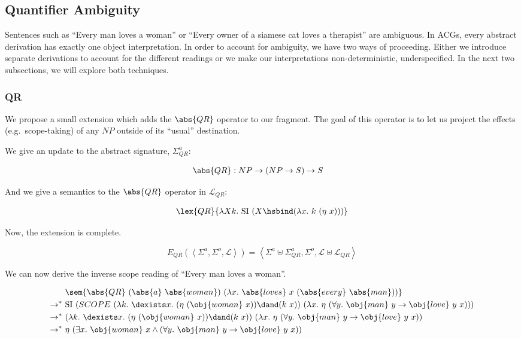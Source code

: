\subsection{Quantifier Ambiguity}

Sentences such as ``Every man loves a woman'' or ``Every owner of a siamese
cat loves a therapist'' are ambiguous. In ACGs, every abstract derivation
has exactly one object interpretation. In order to account for ambiguity,
we have two ways of proceeding. Either we introduce separate derivations to
account for the different readings or we make our interpretations
non-deterministic, underspecified. In the next two subsections, we will
explore both techniques.

\subsubsection{QR}

We propose a small extension which adds the $\abs{QR}$ operator to our
fragment. The goal of this operator is to let us project the effects
(e.g.\ scope-taking) of any $NP$ outside of its ``usual'' destination.

We give an update to the abstract signature, $\Sigma^a_{QR}$:

\begin{align*}
  \abs{QR} &: NP \to (NP \to S) \to S
\end{align*}

And we give a semantics to the $\abs{QR}$ operator in $\mathcal{L}_{QR}$:

\begin{align*}
  \lex{QR}{\lambda X k.\ \mathrm{SI}\ (X \hsbind (\lambda x.\ k\ (\eta\ x)))}
\end{align*}

Now, the extension is complete.

$$
E_{QR}(\left< \Sigma^a, \Sigma^o, \mathcal{L} \right>) = \left< \Sigma^a \uplus \Sigma^a_{QR}, \Sigma^o, \mathcal{L} \uplus \mathcal{L}_{QR} \right>
$$

We can now derive the inverse scope reading of ``Every man loves a woman''.

\begin{align*}
& \sem{\abs{QR}\ (\abs{a}\ \abs{woman})\ (\lambda
    x.\ \abs{loves}\ x\ (\abs{every}\ \abs{man}))} \\
\rightarrow^*\ & \mathrm{SI}\ (SCOPE\ (\lambda k.\ \dexists
x.\ (\eta\ (\obj{woman}\ x)) \dand (k\ x))\ (\lambda x.\ \eta\ (\forall
y.\ \obj{man}\ y \rightarrow \obj{love}\ y\ x))) \\
\rightarrow^*\ & (\lambda k.\ \dexists
x.\ (\eta\ (\obj{woman}\ x)) \dand (k\ x))\ (\lambda x.\ \eta\ (\forall
y.\ \obj{man}\ y \rightarrow \obj{love}\ y\ x)) \\
\rightarrow^*\ & \eta\ (\exists x.\ \obj{woman}\ x \land (\forall
y.\ \obj{man}\ y \rightarrow \obj{love}\ y\ x))
\end{align*}

